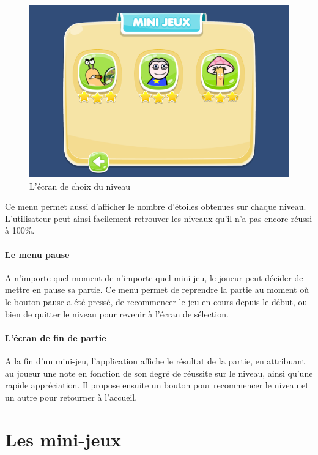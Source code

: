 \begin{figure}[H]\centering
  \includegraphics[scale=0.6]{./img/resultat_niveaux.png}
  \caption{L'écran de choix du niveau}
  \label{analytics}
\end{figure}

Ce menu permet aussi d'afficher le nombre d'étoiles obtenues sur chaque niveau. L'utilisateur peut ainsi facilement retrouver les niveaux qu'il n'a pas encore réussi à 100\%.

\paragraph{Le menu pause}

A n'importe quel moment de n'importe quel mini-jeu, le joueur peut décider de mettre en pause sa partie. Ce menu permet de reprendre la partie au moment où le bouton pause a été pressé, de recommencer le jeu en cours depuis le début, ou bien de quitter le niveau pour revenir à l'écran de sélection.

\paragraph{L'écran de fin de partie}

A la fin d'un mini-jeu, l'application affiche le résultat de la partie, en attribuant au joueur une note en fonction de son degré de réussite sur le niveau, ainsi qu'une rapide appréciation. Il propose ensuite un bouton pour recommencer le niveau et un autre pour retourner à l'accueil.

\section*{Les mini-jeux}

